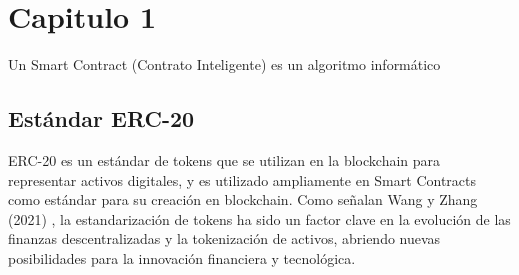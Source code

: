 \chapter{Capitulo 1}
Un Smart Contract (Contrato Inteligente) es un algoritmo informático 

\section{Estándar ERC-20}
ERC-20 es un estándar de tokens que se utilizan en la blockchain para representar activos digitales, y es utilizado ampliamente en Smart Contracts como estándar para su creación en blockchain.
Como señalan Wang y Zhang (2021) \cite{chen2020tokenscope}, la estandarización de tokens ha sido un factor clave en la evolución de las finanzas descentralizadas y la tokenización de activos, abriendo nuevas posibilidades para la innovación financiera y tecnológica.
